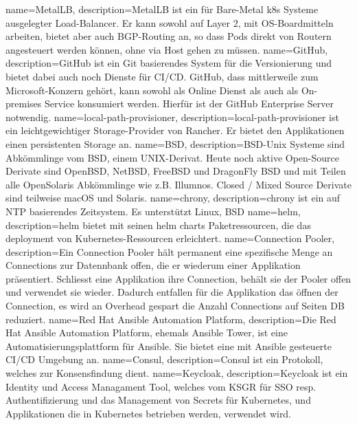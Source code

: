 {
        name=MetalLB,
        description={MetalLB ist ein für Bare-Metal k8s Systeme ausgelegter Load-Balancer.
        Er kann sowohl auf Layer 2, mit OS-Boardmitteln arbeiten, bietet aber auch BGP-Routing an,
        so dass Pods direkt von Routern angesteuert werden können, ohne via Host gehen zu müssen\cite{2B7NV2LT}.}
}
{
        name=GitHub,
        description={GitHub ist ein \Gls{Git} basierendes System für die Versionierung und bietet dabei auch noch Dienste für CI/CD.
        GitHub, dass mittlerweile zum Microsoft-Konzern gehört, kann sowohl als Online Dienst als auch als On-premises Service konsumiert werden.
        Hierfür ist der GitHub Enterprise Server notwendig\cite{R398TJSHB,UL2FJNU}.}
}
{
        name=local-path-provisioner,
        description={local-path-provisioner ist ein leichtgewichtiger Storage-Provider von Rancher.
        Er bietet den Applikationen einen persistenten Storage an.}
}
{
        name=BSD,
        description={BSD-Unix Systeme sind Abkömmlinge vom BSD, einem \Gls{UNIX}-Derivat.
        Heute noch aktive Open-Source Derivate sind OpenBSD, NetBSD, FreeBSD und DragonFly BSD und mit Teilen alle OpenSolaris Abkömmlinge wie z.B. Illumnos.
        Closed / Mixed Source Derivate sind teilweise macOS und Solaris.}
}
{
        name=chrony,
        description={chrony ist ein auf NTP basierendes Zeitsystem.
        Es unterstützt \Gls{Linux}, \Gls{BSD}}
}
{
        name=helm,
        description={helm bietet mit seinen helm charts Paketressourcen, die das deployment von \Gls{Kubernetes}-Ressourcen erleichtert\cite{5846A5VX}.}
}
{
        name=Connection Pooler,
        description={Ein Connection Pooler hält permanent eine spezifische Menge an Connections zur Datennbank offen, die er wiederum einer Applikation präsentiert.
        Schliesst eine Applikation ihre Connection, behält sie der Pooler offen und verwendet sie wieder.
        Dadurch entfallen für die Applikation das öffnen der Connection, es wird an Overhead gespart die Anzahl Connections auf Seiten DB reduziert\cite{NVTGBS8V}.}
}
{
        name=Red Hat Ansible Automation Platform,
        description={Die Red Hat \Gls{Ansible} Automation Platform, ehemals \Gls{Ansible} Tower, ist eine Automatisierungsplattform für Ansible.
        Sie bietet eine mit \Gls{Ansible} gesteuerte \Gls{CI/CD} Umgebung an\cite{CJ672FB7}.}
}
{
        name=Consul,
        description={Consul ist ein Protokoll, welches zur Konsensfindung dient\cite{ZQMA4XBU, XMH9K4TW}.}
}
{
        name=Keycloak,
        description={Keycloak ist ein Identity und Access Managament Tool\cite{PJWRII7N},
        welches vom KSGR für SSO resp. Authentifizierung und das Management von Secrets für \Gls{Kubernetes}, und Applikationen die in \Gls{Kubernetes} betrieben werden, verwendet wird.}
}